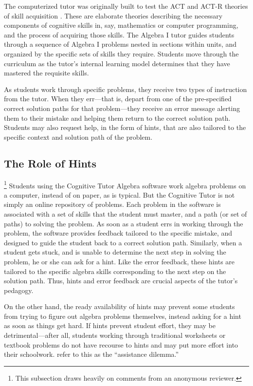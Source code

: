 \documentclass{article}
\begin{document}
The computerized tutor was originally built to test the ACT and ACT-R
theories of skill acquisition \citep{anderson2013architecture}.
These are elaborate theories describing the necessary components of
cognitive skills in, say, mathematics or computer programming, and the
process of acquiring those skills.
The Algebra I tutor guides students through a sequence of Algebra I
problems nested in sections within units, and organized by the specific sets of skills they require.
Students move through the curriculum as the tutor's internal learning
model determines that they have mastered the requisite skills.

As students work through specific problems, they receive two types
of instruction from the tutor.
When they err---that is, depart from one of the pre-specified correct
solution paths for that problem---they receive an error message
alerting them to their mistake and helping them return to the correct
solution path.
Students may also request help, in the form of hints, that are also
tailored to the specific context and solution path of the problem.

\subsection{The Role of Hints}\footnote{This subsection draws heavily
  on comments from an anonymous reviewer.}
Students using the Cognitive Tutor Algebra software work algebra
problems on a computer, instead of on paper, as is typical.
But the Cognitive Tutor is not simply an online repository of
problems.
Each problem in the software is associated with a set of skills that
the student must master, and a path (or set of paths) to solving the
problem.
As soon as a student errs in working through the problem, the
software provides feedback tailored to the specific mistake, and
designed to guide the student back to a correct solution path.
Similarly, when a student gets stuck, and is unable to determine the
next step in solving the problem, he or she can ask for a hint.
Like the error feedback, these hints are tailored to the specific
algebra skills corresponding to the next step on the solution path.
Thus, hints and error feedback are crucial aspects of the tutor's
pedagogy.

On the other hand, the ready availability of hints may prevent some
students from trying to figure out algebra problems themselves,
instead asking for a hint as soon as things get hard.
If hints prevent student effort, they may be detrimental---after all,
students working through traditional worksheets or textbook problems
do not have recourse to hints and may put more effort into their
schoolwork.
\citet{koedinger2007exploring} refer to this as the ``assistance
dilemma.''
\end{document}

